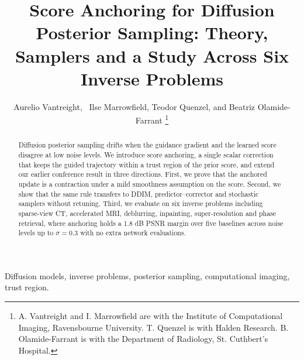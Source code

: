 \documentclass[journal]{IEEEtran}
\title{Score Anchoring for Diffusion Posterior Sampling: Theory, Samplers and a Study Across Six Inverse Problems}
\author{Aurelio Vantreight,~\IEEEmembership{Member,~IEEE,} Ilse Marrowfield, Teodor Quenzel, and Beatriz Olamide-Farrant%
\thanks{A. Vantreight and I. Marrowfield are with the Institute of Computational Imaging, Ravensbourne University. T. Quenzel is with Halden Research. B. Olamide-Farrant is with the Department of Radiology, St. Cuthbert's Hospital.}}
\begin{document}
\maketitle

\begin{abstract}
Diffusion posterior sampling drifts when the guidance gradient and the learned score disagree at low noise levels. We introduce score anchoring, a single scalar correction that keeps the guided trajectory within a trust region of the prior score, and extend our earlier conference result in three directions. First, we prove that the anchored update is a contraction under a mild smoothness assumption on the score. Second, we show that the same rule transfers to DDIM, predictor--corrector and stochastic samplers without retuning. Third, we evaluate on six inverse problems including sparse-view CT, accelerated MRI, deblurring, inpainting, super-resolution and phase retrieval, where anchoring holds a 1.8 dB PSNR margin over five baselines across noise levels up to $\sigma = 0.3$ with no extra network evaluations.
\end{abstract}

\begin{IEEEkeywords}
Diffusion models, inverse problems, posterior sampling, computational imaging, trust region.
\end{IEEEkeywords}










\appendices





\end{document}
